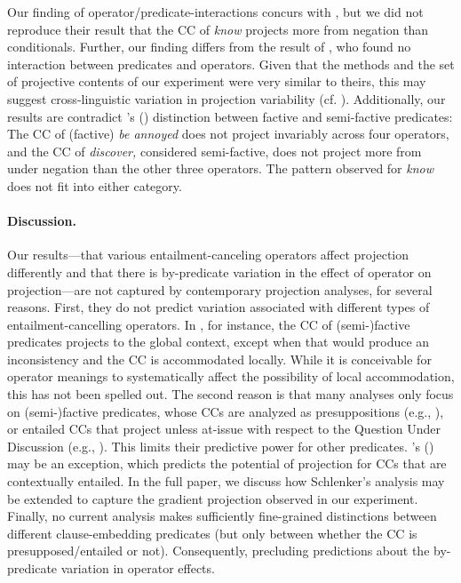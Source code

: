 \documentclass[11pt, a4paper]{article}
\newcommand{\posscite}[1]{\citeauthor{#1}'s (\citeyear{#1})}
\begin{document}
	Our finding of operator/predicate-interactions concurs with \citet{smith_projection_2011}, but we did not reproduce their result that the CC of \emph{know} projects more from negation than conditionals.
	Further, our finding differs from the result of \citet{sieker_projective_2022}, who found no interaction between predicates and operators. Given that the methods and the set of projective contents of our experiment were very similar to theirs, this may suggest cross-linguistic variation in projection variability (cf. \citealt{tonhauser_projection_2020}).
	Additionally, our results are contradict \posscite{karttunen_observations_1971} distinction between factive and semi-factive predicates: The CC of (factive) \emph{be annoyed} does not project invariably across four operators, and the CC of \emph{discover,}  considered semi-factive, does not project more from under negation than the other three operators. The pattern observed for {\em know} does not fit into either category.
	
	
\paragraph{Discussion.}
	Our results---that various entailment-canceling operators affect projection differently and that there is by-predicate variation in the effect of operator on projection---are not captured by contemporary projection analyses, for several reasons.
	First, they do not predict variation associated with different types of entailment-cancelling operators. In \citet{heim_projection_1983}, for instance, the CC of (semi-)factive predicates projects to the global context, except when that would produce an inconsistency and the CC is accommodated locally. While it is conceivable for operator meanings to systematically affect the possibility of local accommodation, this has not been spelled out.
	The second reason is that many analyses only focus on (semi-)factive predicates, whose CCs are analyzed as presuppositions (e.g., \citealt{heim_projection_1983,van_der_sandt_presupposition_1992}), or entailed CCs that project unless at-issue with respect to the Question Under Discussion (e.g., \citealt{abrusan_predicting_2011,simons_best_2017}). This limits their predictive power for other predicates.
	\posscite{schlenker_triggering_2021} may be an exception, which predicts the potential of projection for CCs that are contextually entailed. In the full paper, we discuss how Schlenker's analysis may be extended to capture the gradient projection observed in our experiment.
	Finally, no current analysis makes sufficiently fine-grained distinctions between different clause-embedding predicates (but only between whether the CC is presupposed/entailed or not). Consequently, precluding predictions about the by-predicate variation in operator effects.
\end{document}
